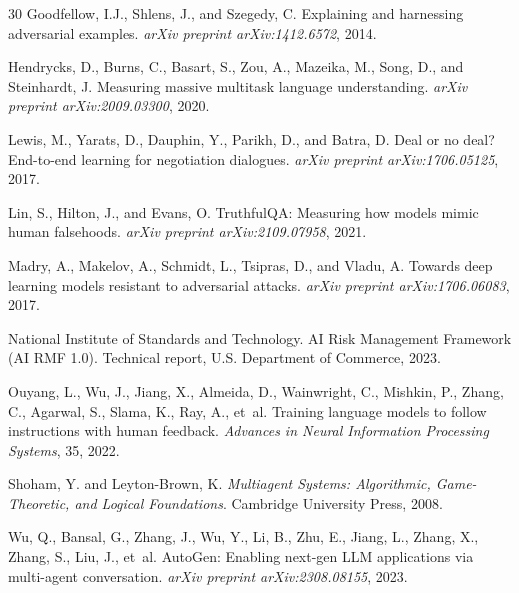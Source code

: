 \documentclass[11pt,a4paper]{article}
\begin{document}
\begin{thebibliography}{30}
Goodfellow, I.J., Shlens, J., and Szegedy, C.
\newblock Explaining and harnessing adversarial examples.
\newblock \emph{arXiv preprint arXiv:1412.6572}, 2014.

Hendrycks, D., Burns, C., Basart, S., Zou, A., Mazeika, M., Song, D., and Steinhardt, J.
\newblock Measuring massive multitask language understanding.
\newblock \emph{arXiv preprint arXiv:2009.03300}, 2020.

Lewis, M., Yarats, D., Dauphin, Y., Parikh, D., and Batra, D.
\newblock Deal or no deal? End-to-end learning for negotiation dialogues.
\newblock \emph{arXiv preprint arXiv:1706.05125}, 2017.

Lin, S., Hilton, J., and Evans, O.
\newblock TruthfulQA: Measuring how models mimic human falsehoods.
\newblock \emph{arXiv preprint arXiv:2109.07958}, 2021.

Madry, A., Makelov, A., Schmidt, L., Tsipras, D., and Vladu, A.
\newblock Towards deep learning models resistant to adversarial attacks.
\newblock \emph{arXiv preprint arXiv:1706.06083}, 2017.

National Institute of Standards and Technology.
\newblock AI Risk Management Framework (AI RMF 1.0).
\newblock Technical report, U.S. Department of Commerce, 2023.

Ouyang, L., Wu, J., Jiang, X., Almeida, D., Wainwright, C., Mishkin, P., Zhang, C., Agarwal, S., Slama, K., Ray, A., et~al.
\newblock Training language models to follow instructions with human feedback.
\newblock \emph{Advances in Neural Information Processing Systems}, 35, 2022.

Shoham, Y. and Leyton-Brown, K.
\newblock \emph{Multiagent Systems: Algorithmic, Game-Theoretic, and Logical Foundations}.
\newblock Cambridge University Press, 2008.

Wu, Q., Bansal, G., Zhang, J., Wu, Y., Li, B., Zhu, E., Jiang, L., Zhang, X., Zhang, S., Liu, J., et~al.
\newblock AutoGen: Enabling next-gen LLM applications via multi-agent conversation.
\newblock \emph{arXiv preprint arXiv:2308.08155}, 2023.

\end{thebibliography}
\end{document}

